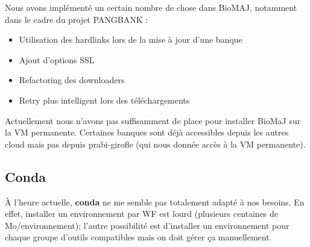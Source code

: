Nous avons implémenté un certain nombre de chose dans BioMAJ, notamment dans le cadre du projet PANGBANK :
\begin{itemize}
    \item Utilisation des hardlinks lors de la mise à jour d'une banque
    \item Ajout d'options SSL
    \item Refactoring des downloaders
    \item Retry plus intelligent lors des téléchargements
\end{itemize}
Actuellement nous n'avons pas suffisamment de place pour installer BioMaJ sur la VM permanente.
Certaines banques sont déjà accessibles depuis les autres cloud mais pas depuis prabi-girofle (qui nous donnée accès à la VM permanente).

\subsection{Conda}
À l'heure actuelle, \textbf{conda} ne me semble pas totalement adapté à nos besoins.
En effet, installer un environnement par WF est lourd (plusieurs centaines de Mo/environnement); l'autre possibilité est d'installer un environnement pour chaque groupe d'outils compatibles mais on doit gérer ça manuellement.
